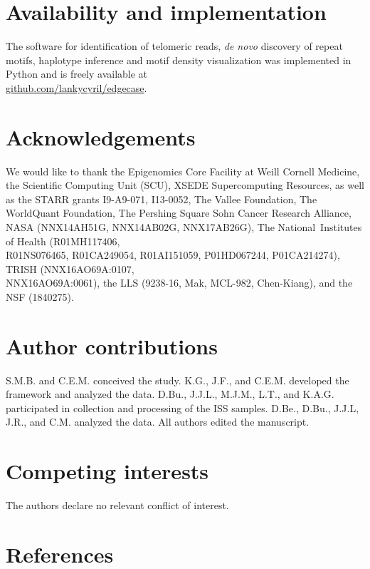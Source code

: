 \documentclass{article}
\begin{document}
\section*{Availability and implementation} 
The software for identification of telomeric reads, \textit{de novo} discovery of repeat motifs, haplotype inference and motif density visualization was implemented in Python and is freely available at \\%
\href{https://github.com/lankycyril/edgecase}{github.com/lankycyril/edgecase}.

\section*{Acknowledgements} 
We would like to thank
the Epigenomics Core Facility at Weill Cornell Medicine,
the Scientific Computing Unit (SCU),
XSEDE Supercomputing Resources,
as well as
the STARR grants I9-A9-071, I13-0052,
The Vallee Foundation,
The WorldQuant Foundation,
The Pershing Square Sohn Cancer Research Alliance,
NASA (NNX14AH51G, NNX14AB02G, NNX17AB26G),
The National Institutes of Health (R01MH117406, \\%
R01NS076465, R01CA249054, R01AI151059, P01HD067244, P01CA214274),
TRISH (NNX16AO69A:0107, \\%
NNX16AO69A:0061),
the LLS (9238-16, Mak, MCL-982, Chen-Kiang),
and
the NSF (1840275).

\section*{Author contributions} 
S.M.B. and C.E.M. conceived the study.
K.G., J.F., and C.E.M. developed the framework and analyzed the data.
D.Bu., J.J.L., M.J.M., L.T., and K.A.G. participated in collection and processing of the ISS samples.
D.Be., D.Bu., J.J.L, J.R., and C.M. analyzed the data.
All authors edited the manuscript.

\section*{Competing interests} 
The authors declare no relevant conflict of interest.

\section*{References} 
\begingroup \raggedright \singlespacing \printbibliography[heading=none] \endgroup
\end{document}
